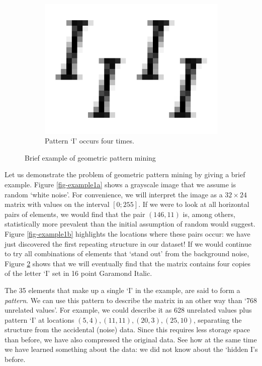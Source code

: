 \documentclass{llncs}
\begin{document}
\begin{figure}
\begin{subfigure}[t]{0.20\textwidth}
\end{subfigure}%
~
\begin{subfigure}[t]{0.37\textwidth}
\centering
\includegraphics[scale=.25]{img/Garamond-I-clean.png}
\caption{Pattern `I' occurs four times.}
\label{fig-example1c}
\end{subfigure}%
\caption{Brief example of geometric pattern mining}
\end{figure}  

Let us demonstrate the problem of geometric pattern mining by giving a brief example. Figure \ref{fig-example1a} shows a grayscale image that we assume is random `white noise'. For convenience, we will interpret the image as a $32 \times 24$ matrix with values on the interval $[0;255]$. If we were to look at all horizontal pairs of elements, we would find that the pair $(146,11)$ is, among others, statistically more prevalent than the initial assumption of random would suggest. Figure \ref{fig-example1b} highlights the locations where these pairs occur: we have just discovered the first repeating structure in our dataset! If we would continue to try all combinations of elements that `stand out' from the background noise, Figure \ref{fig-example1c} shows that we will eventually find that the matrix contains four copies of the letter `I' set in 16 point Garamond Italic.

The 35 elements that make up a single `I' in the example, are said to form a \emph{pattern}. We can use this pattern to describe the matrix in an other way than `768 unrelated values'. For example, we could describe it as 628 unrelated values plus pattern `I' at locations $(5,4), (11,11), (20,3), (25,10)$, separating the structure from the accidental (noise) data. Since this requires less storage space than before, we have also compressed the original data. See how at the same time we have learned something about the data: we did not know about the `hidden I's before. 
\end{document}
